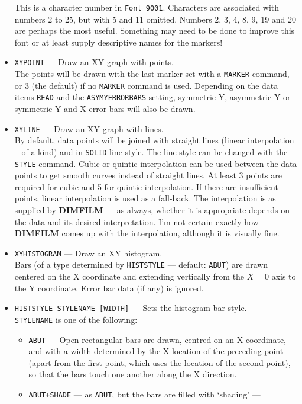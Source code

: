 \documentclass[a4paper,twoside,11pt]{article}
\newcommand{\textttc}[1]{\texttt{\textcolor{OurRed}{#1}}}
\begin{document}
\begin{itemize}
   This is a character number in \texttt{Font 9001}. Characters are associated
   with numbers 2 to 25, but with 5 and 11 omitted. Numbers 2, 3, 4, 8, 9, 19 and 20 are perhaps the most useful.
   Something may need to be done to improve this font or at least supply descriptive names for the markers!
\item \textttc{XYPOINT} --- Draw an XY graph with points.\\
   The points will be drawn with the last marker set with a \texttt{MARKER}
   command, or 3 (the default) if no \texttt{MARKER} command is used. 
   Depending on the data items \texttt{READ} and the \texttt{ASYMYERRORBARS}
   setting, symmetric Y, asymmetric Y or symmetric Y and X error bars will also be drawn.
\item \textttc{XYLINE} --- Draw an XY graph with lines.\\
   By default, data points will be joined with straight lines (linear
   interpolation -- of a kind) and in \texttt{SOLID} line style. The line style can be changed with the \texttt{STYLE} command.
   Cubic or quintic interpolation can be used between the data points to get smooth curves instead of straight lines.
   At least 3 points are required for cubic and 5 for quintic interpolation. If there are insufficient points, linear
   interpolation is used as a fall-back. The interpolation is as supplied by \textbf{DIMFILM} --- as always, whether it is appropriate
   depends on the data and its desired interpretation. I'm not certain exactly how \textbf{DIMFILM} comes up with the interpolation,
   although it is visually fine.
\item \textttc{XYHISTOGRAM} --- Draw an XY histogram.\\
   Bars (of a type determined by \texttt{HISTSTYLE} --- default: \texttt{ABUT}) 
   are drawn centered on the X coordinate and extending vertically
   from the $X=0$ axis to the Y coordinate. Error bar data (if any) is ignored.
\item \textttc{HISTSTYLE STYLENAME [WIDTH]} --- Sets the histogram bar style.\\
   \texttt{STYLENAME} is one of the following:
   \begin{itemize}
   \item \textttc{ABUT} --- Open rectangular bars are drawn, centred on an X coordinate, and with a width determined by the X location
   of the preceding point (apart from the first point, which uses the location of the second point), so that the bars touch one
   another along the X direction.
   \item \textttc{ABUT+SHADE} --- as \texttt{ABUT}, but the bars are filled with `shading' ---

\end{itemize}
\end{itemize}
\end{document}
